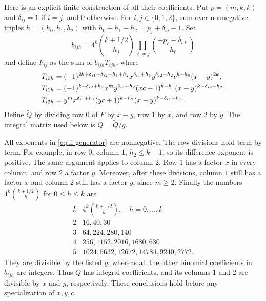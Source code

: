\documentclass[12pt]{article}
\numberwithin{equation}{section}
\begin{document}
Here is an explicit finite construction of all their coefficients.
Put $p=(m,k,k)$ and $\delta_{ij}=1$ if $i=j$, and $0$ otherwise.
For $i,j\in\{0,1,2\}$, sum over nonnegative triples $h=(h_0,h_1,h_2)$
with $h_0+h_1+h_2=p_j+\delta_{ij}-1$. Set
\[
 b_{ijh}=4^k\binom{k+1/2}{h_j}
                 \prod_{\ell\ne j}\binom{-p_\ell-\delta_{i\ell}}{h_\ell}
\]
and define $F_{ij}$ as the sum of $b_{ijh}T_{ijh}$, where
\begin{align}
 T_{i0h}&=(-1)^{2k+\delta_{i1}+\delta_{i2}+h_1+h_2}
 x^{\delta_{i1}+h_1}y^{\delta_{i2}+h_2}
 c^{k-h_0}(x-y)^{2k},\notag\\
 T_{i1h}&=(-1)^{k+\delta_{i2}+h_2}
 x^m y^{\delta_{i2}+h_2}(xc+1)^{k-h_1}
 (x-y)^{k-\delta_{i2}-h_2},\label{eq:ff-generator}\\
 T_{i2h}&=y^m x^{\delta_{i1}+h_1}(yc+1)^{k-h_2}
 (x-y)^{k-\delta_{i1}-h_1}.\notag
\end{align}
Define $\widetilde Q$ by dividing row $0$ of $F$ by $x-y$, row $1$ by $x$, and row $2$ by $y$. The integral matrix used below is $Q=\widetilde Q/g$.

All exponents in \eqref{eq:ff-generator} are nonnegative. The row
divisions hold term by term. For example, in row $0$, column $1$,
$h_2\le k-1$, so its difference exponent is positive. The same argument applies to column $2$. Row $1$ has a factor $x$ in every column, and row
$2$ a factor $y$. Moreover, after these divisions, column $1$ still
has a factor $x$ and column $2$ still has a factor $y$, since $m\ge2$.
Finally the numbers $4^k\binom{k+1/2}{h}$ for $0\le h\le k$ are
\[
\begin{array}{c|l}
 k&4^k\binom{k+1/2}{h},\quad h=0,\ldots,k\\ \hline
 2&16,40,30\\
 3&64,224,280,140\\
 4&256,1152,2016,1680,630\\
 5&1024,5632,12672,14784,9240,2772.
\end{array}
\]
They are divisible by the listed $g$, whereas all the other binomial
coefficients in $b_{ijh}$ are integers. Thus $Q$ has integral coefficients, and its columns $1$ and $2$ are divisible by $x$ and $y$, respectively. These conclusions hold
before any specialization of $x,y,c$.
\end{document}
